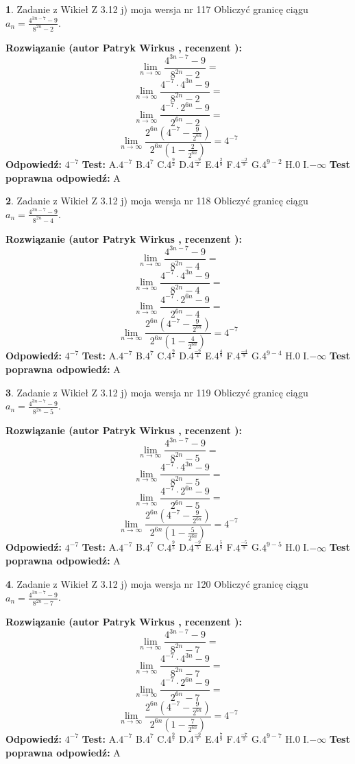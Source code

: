 \documentclass[12pt, a4paper]{article}
\theoremstyle{definition} %
\newtheorem{zad}{}
\newcommand{\zadStart}[1]{\begin{zad}#1\newline}
\newcommand{\zadStop}{\end{zad}}
\newcommand{\rozwStart}[2]{\noindent \textbf{Rozwiązanie (autor #1 , recenzent #2): }\newline}
\newcommand{\rozwStop}{\newline}
\newcommand{\odpStart}{\noindent \textbf{Odpowiedź:}\newline}
\newcommand{\odpStop}{\newline}
\newcommand{\testStart}{\noindent \textbf{Test:}\newline}
\newcommand{\testStop}{\newline}
\newcommand{\kluczStart}{\noindent \textbf{Test poprawna odpowiedź:}\newline}
\newcommand{\kluczStop}{\newline}
\begin{document}
\zadStart{Zadanie z Wikieł Z 3.12 j) moja wersja nr 117}
Obliczyć granicę ciągu $a_{n}=\frac{4^{3n-7}-9}{8^{2n}-2}$.
\zadStop
\rozwStart{Patryk Wirkus}{}
$$\lim\limits_{n\to\infty}\frac{4^{3n-7}-9}{8^{2n}-2}=$$
$$\lim\limits_{n\to\infty}\frac{4^{-7} \cdot 4^{3n}-9}{8^{2n}-2}=$$
$$\lim\limits_{n\to\infty}\frac{4^{-7} \cdot 2^{6n}-9}{2^{6n}-2}=$$
$$\lim\limits_{n\to\infty}\frac{2^{6n}(4^{-7} - \frac{9}{2^{6n}})}{2^{6n}(1-\frac{2}{2^{6n}})}= 4^{-7}$$
\rozwStop
\odpStart
$4^{-7}$
\odpStop
\testStart
A.$4^{-7}$
B.$4^{7}$
C.$4^{\frac{9}{2}}$
D.$4^{\frac{-9}{2}}$
E.$4^{\frac{2}{9}}$
F.$4^{\frac{-2}{9}}$
G.$4^{9-2}$
H.$0$
I.$-\infty$
\testStop
\kluczStart
A
\kluczStop



\zadStart{Zadanie z Wikieł Z 3.12 j) moja wersja nr 118}
Obliczyć granicę ciągu $a_{n}=\frac{4^{3n-7}-9}{8^{2n}-4}$.
\zadStop
\rozwStart{Patryk Wirkus}{}
$$\lim\limits_{n\to\infty}\frac{4^{3n-7}-9}{8^{2n}-4}=$$
$$\lim\limits_{n\to\infty}\frac{4^{-7} \cdot 4^{3n}-9}{8^{2n}-4}=$$
$$\lim\limits_{n\to\infty}\frac{4^{-7} \cdot 2^{6n}-9}{2^{6n}-4}=$$
$$\lim\limits_{n\to\infty}\frac{2^{6n}(4^{-7} - \frac{9}{2^{6n}})}{2^{6n}(1-\frac{4}{2^{6n}})}= 4^{-7}$$
\rozwStop
\odpStart
$4^{-7}$
\odpStop
\testStart
A.$4^{-7}$
B.$4^{7}$
C.$4^{\frac{9}{4}}$
D.$4^{\frac{-9}{4}}$
E.$4^{\frac{4}{9}}$
F.$4^{\frac{-4}{9}}$
G.$4^{9-4}$
H.$0$
I.$-\infty$
\testStop
\kluczStart
A
\kluczStop



\zadStart{Zadanie z Wikieł Z 3.12 j) moja wersja nr 119}
Obliczyć granicę ciągu $a_{n}=\frac{4^{3n-7}-9}{8^{2n}-5}$.
\zadStop
\rozwStart{Patryk Wirkus}{}
$$\lim\limits_{n\to\infty}\frac{4^{3n-7}-9}{8^{2n}-5}=$$
$$\lim\limits_{n\to\infty}\frac{4^{-7} \cdot 4^{3n}-9}{8^{2n}-5}=$$
$$\lim\limits_{n\to\infty}\frac{4^{-7} \cdot 2^{6n}-9}{2^{6n}-5}=$$
$$\lim\limits_{n\to\infty}\frac{2^{6n}(4^{-7} - \frac{9}{2^{6n}})}{2^{6n}(1-\frac{5}{2^{6n}})}= 4^{-7}$$
\rozwStop
\odpStart
$4^{-7}$
\odpStop
\testStart
A.$4^{-7}$
B.$4^{7}$
C.$4^{\frac{9}{5}}$
D.$4^{\frac{-9}{5}}$
E.$4^{\frac{5}{9}}$
F.$4^{\frac{-5}{9}}$
G.$4^{9-5}$
H.$0$
I.$-\infty$
\testStop
\kluczStart
A
\kluczStop



\zadStart{Zadanie z Wikieł Z 3.12 j) moja wersja nr 120}
Obliczyć granicę ciągu $a_{n}=\frac{4^{3n-7}-9}{8^{2n}-7}$.
\zadStop
\rozwStart{Patryk Wirkus}{}
$$\lim\limits_{n\to\infty}\frac{4^{3n-7}-9}{8^{2n}-7}=$$
$$\lim\limits_{n\to\infty}\frac{4^{-7} \cdot 4^{3n}-9}{8^{2n}-7}=$$
$$\lim\limits_{n\to\infty}\frac{4^{-7} \cdot 2^{6n}-9}{2^{6n}-7}=$$
$$\lim\limits_{n\to\infty}\frac{2^{6n}(4^{-7} - \frac{9}{2^{6n}})}{2^{6n}(1-\frac{7}{2^{6n}})}= 4^{-7}$$
\rozwStop
\odpStart
$4^{-7}$
\odpStop
\testStart
A.$4^{-7}$
B.$4^{7}$
C.$4^{\frac{9}{7}}$
D.$4^{\frac{-9}{7}}$
E.$4^{\frac{7}{9}}$
F.$4^{\frac{-7}{9}}$
G.$4^{9-7}$
H.$0$
I.$-\infty$
\testStop
\kluczStart
A
\kluczStop
\end{document}
